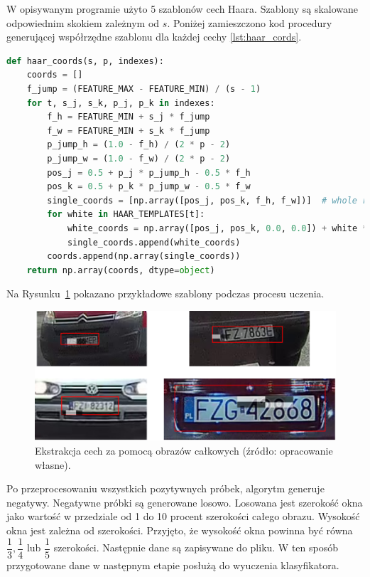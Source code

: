 W opisywanym programie użyto 5 szablonów cech Haara.
Szablony są skalowane odpowiednim skokiem zależnym od $s$.
Poniżej zamieszczono kod procedury generującej współrzędne szablonu dla każdej cechy \ref{lst:haar_cords}.
\begin{lstlisting}[language=Python, caption=Procedura generujące szablony cech Haara dla konkretnych wpsółrzędnych, label={lst:haar_cords}]
def haar_coords(s, p, indexes):
    coords = []
    f_jump = (FEATURE_MAX - FEATURE_MIN) / (s - 1)
    for t, s_j, s_k, p_j, p_k in indexes:
        f_h = FEATURE_MIN + s_j * f_jump
        f_w = FEATURE_MIN + s_k * f_jump
        p_jump_h = (1.0 - f_h) / (2 * p - 2)
        p_jump_w = (1.0 - f_w) / (2 * p - 2)
        pos_j = 0.5 + p_j * p_jump_h - 0.5 * f_h
        pos_k = 0.5 + p_k * p_jump_w - 0.5 * f_w
        single_coords = [np.array([pos_j, pos_k, f_h, f_w])]  # whole rectangle for single feature
        for white in HAAR_TEMPLATES[t]:
            white_coords = np.array([pos_j, pos_k, 0.0, 0.0]) + white * np.array([f_h, f_w, f_h, f_w])
            single_coords.append(white_coords)
        coords.append(np.array(single_coords))
    return np.array(coords, dtype=object)
\end{lstlisting}
Na Rysunku~\ref{fig:haar_feats_examples} pokazano przykładowe szablony podczas procesu uczenia.
\begin{figure}[!ht]
    \centering
    \includegraphics[scale=0.6]{Pictures/haar_tepmplates}
    \caption{Ekstrakcja cech za pomocą obrazów całkowych (źródło: opracowanie własne).}
    \label{fig:haar_feats_examples}
\end{figure}
\FloatBarrier

Po przeprocesowaniu wszystkich pozytywnych próbek, algorytm generuje negatywy.
Negatywne próbki są generowane losowo.
Losowana jest szerokość okna jako wartość w przedziale od 1 do 10 procent szerokości całego obrazu.
Wysokość okna jest zależna od szerokości.
Przyjęto, że wysokość okna powinna być równa $\dfrac{1}{3}, \dfrac{1}{4}$ lub $\dfrac{1}{5}$ szerokości.
Następnie dane są zapisywane do pliku.
W ten sposób przygotowane dane w następnym etapie posłużą do wyuczenia klasyfikatora.

